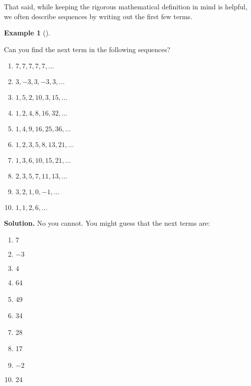 \documentclass[10pt,]{book}
\theoremstyle{plain}
\theoremstyle{definition}
\newtheorem{example}[theorem]{Example}
\theoremstyle{definition}
\theoremstyle{definition}
\numberwithin{equation}{chapter}
\begin{document}
    That said, while keeping the rigorous mathematical definition in mind is helpful, we often describe sequences by writing out the first few terms.
\begin{example}[]\label{example-57}

        Can you find the next term in the following sequences?
\par

        \leavevmode%
\begin{enumerate}
\item\hypertarget{li-810}{}\(7,7,7,7,7, \ldots\)%
\item\hypertarget{li-811}{}\(3, -3, 3, -3, 3, \ldots\)%
\item\hypertarget{li-812}{}\(1, 5, 2, 10, 3, 15, \ldots\)%
\item\hypertarget{li-813}{}\(1, 2, 4, 8, 16, 32, \ldots\)%
\item\hypertarget{li-814}{}\(1, 4, 9, 16, 25, 36, \ldots\)%
\item\hypertarget{li-815}{}\(1, 2, 3, 5, 8, 13, 21, \ldots\)%
\item\hypertarget{li-816}{}\(1, 3, 6, 10, 15, 21, \ldots\)%
\item\hypertarget{li-817}{}\(2, 3, 5, 7, 11, 13, \ldots\)%
\item\hypertarget{li-818}{}\(3, 2, 1, 0, -1, \ldots\)%
\item\hypertarget{li-819}{}\(1, 1, 2, 6, \ldots\)%
\end{enumerate}

\par\medskip\noindent%
\textbf{Solution.}\quad
        No you cannot. You might guess that the next terms are:
\par

        \leavevmode%
\begin{enumerate}
\item\hypertarget{li-820}{}\(7\)%
\item\hypertarget{li-821}{}\(-3\)%
\item\hypertarget{li-822}{}\(4\)%
\item\hypertarget{li-823}{}
              64
\item\hypertarget{li-824}{}
              49
\item\hypertarget{li-825}{}
              34
\item\hypertarget{li-826}{}
              28
\item\hypertarget{li-827}{}
              17
\item\hypertarget{li-828}{}\(-2\)%
\item\hypertarget{li-829}{}\(24\)%
\end{enumerate}


\end{example}
\end{document}

